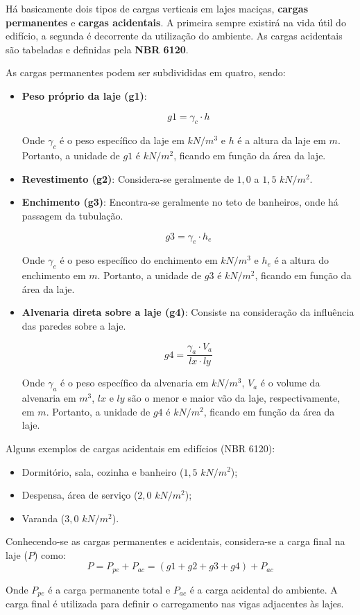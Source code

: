 Há basicamente dois tipos de cargas verticais em lajes maciças, \textbf{cargas permanentes} e \textbf{cargas acidentais}. A primeira sempre existirá na vida útil do edifício, a segunda é decorrente da utilização do ambiente. As cargas acidentais são tabeladas e definidas pela \textbf{NBR 6120}.

As cargas permanentes podem ser subdivididas em quatro, sendo:

\begin{itemize}

	\item \textbf{Peso próprio da laje (g1)}:
	
		$$g1=\gamma_c \cdot h$$

		Onde $\gamma_c$ é o peso específico da laje em $kN/m^3$ e $h$ é a altura da laje em $m$. Portanto, a unidade de $g1$ é $kN/m^2$, ficando em função da área da laje.
		
	\item \textbf{Revestimento (g2)}:
		Considera-se geralmente de $1,0$ a $1,5$ $kN/m^2$.
		
	\item \textbf{Enchimento (g3)}:
		Encontra-se geralmente no teto de banheiros, onde há passagem da tubulação.
		
		$$g3=\gamma_e \cdot h_e$$
		
		Onde $\gamma_e$ é o peso específico do enchimento em $kN/m^3$ e $h_e$ é a altura do enchimento em $m$. Portanto, a unidade de $g3$ é $kN/m^2$, ficando em função da área da laje.
		
	\item \textbf{Alvenaria direta sobre a laje (g4)}:
		Consiste na consideração da influência das paredes sobre a laje.
		
		$$g4=\frac{\gamma_a \cdot V_a}{lx \cdot ly}$$
		
		Onde $\gamma_a$ é o peso específico da alvenaria em $kN/m^3$, $V_a$ é o volume da alvenaria em $m^3$, $lx$ e $ly$ são o menor e maior vão da laje, respectivamente, em $m$. Portanto, a unidade de $g4$ é $kN/m^2$, ficando em função da área da laje.		
		
\end{itemize}

Alguns exemplos de cargas acidentais em edifícios (NBR 6120):

\begin{itemize}
	\item Dormitório, sala, cozinha e banheiro ($1,5$ $kN/m^2$);
	\item Despensa, área de serviço ($2,0$ $kN/m^2$);
	\item Varanda ($3,0$ $kN/m^2$).
\end{itemize}

Conhecendo-se as cargas permanentes e acidentais, considera-se a carga final na laje ($P$) como: $$P=P_{pe}+P_{ac}=(g1+g2+g3+g4)+P_{ac}$$

Onde $P_{pe}$ é a carga permanente total e $P_{ac}$ é a carga acidental do ambiente.
A carga final é utilizada para definir o carregamento nas vigas adjacentes às lajes.